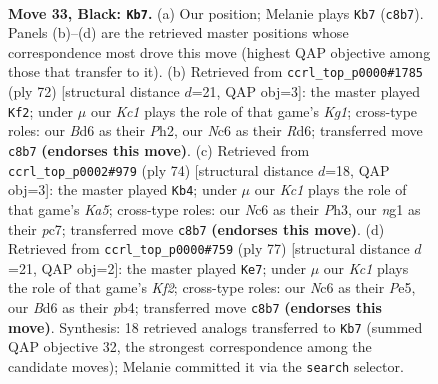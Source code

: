\documentclass[11pt]{article}
\begin{document}
\clearpage

\begin{figure}[p]\centering
\begin{subfigure}{0.46\textwidth}\centering
\resizebox{\linewidth}{!}{%
\newchessgame
\chessboard[
  setfen={2k5/8/2nb2p1/6P1/p7/3bB3/8/4K1N1 b - - 1 33},
  showmover=false,
  pgfstyle=straightmove, color=movearrow, markmove={c8-b7}
]}
\caption{}
\end{subfigure}\hfill
\begin{subfigure}{0.46\textwidth}\centering
\resizebox{\linewidth}{!}{%
\newchessgame
\chessboard[
  setfen={r7/7k/3R4/5p2/4b3/2B3P1/7P/6K1 w - - 1 37},
  showmover=false,
  pgfstyle=straightmove, color=movearrow, markmove={g1-f2}
]}
\caption{}
\end{subfigure}
\\[4pt]
\begin{subfigure}{0.46\textwidth}\centering
\resizebox{\linewidth}{!}{%
\newchessgame
\chessboard[
  setfen={8/2p5/6p1/K2k2P1/8/3b3P/5B2/8 w - - 1 38},
  showmover=false,
  pgfstyle=straightmove, color=movearrow, markmove={a5-b4}
]}
\caption{}
\end{subfigure}\hfill
\begin{subfigure}{0.46\textwidth}\centering
\resizebox{\linewidth}{!}{%
\newchessgame
\chessboard[
  setfen={8/5k2/5p2/4p3/1P4P1/8/K5P1/2bB4 b - - 0 39},
  showmover=false,
  pgfstyle=straightmove, color=movearrow, markmove={f7-e7}
]}
\caption{}
\end{subfigure}
\caption{\textbf{Move 33, Black: \texttt{Kb7}.} (a) Our position; Melanie plays \texttt{Kb7} (\texttt{c8b7}). Panels (b)--(d) are the retrieved master positions whose correspondence most drove this move (highest QAP objective among those that transfer to it). (b) Retrieved from \texttt{ccrl\_top\_p0000\#1785} (ply 72) [structural distance $d$=21, QAP obj=3]: the master played \texttt{Kf2}; under $\mu$ our \emph{Kc1} plays the role of that game's \emph{Kg1}; cross-type roles: our \emph{B}d6 as their \emph{P}h2, our \emph{N}c6 as their \emph{R}d6; transferred move \texttt{c8b7} \textbf{(endorses this move)}. (c) Retrieved from \texttt{ccrl\_top\_p0002\#979} (ply 74) [structural distance $d$=18, QAP obj=3]: the master played \texttt{Kb4}; under $\mu$ our \emph{Kc1} plays the role of that game's \emph{Ka5}; cross-type roles: our \emph{N}c6 as their \emph{P}h3, our \emph{n}g1 as their \emph{p}c7; transferred move \texttt{c8b7} \textbf{(endorses this move)}. (d) Retrieved from \texttt{ccrl\_top\_p0000\#759} (ply 77) [structural distance $d$=21, QAP obj=2]: the master played \texttt{Ke7}; under $\mu$ our \emph{Kc1} plays the role of that game's \emph{Kf2}; cross-type roles: our \emph{N}c6 as their \emph{P}e5, our \emph{B}d6 as their \emph{p}b4; transferred move \texttt{c8b7} \textbf{(endorses this move)}. Synthesis: 18 retrieved analogs transferred to \texttt{Kb7} (summed QAP objective 32, the strongest correspondence among the candidate moves); Melanie committed it via the \texttt{search} selector.}
\label{fig:thought-m65}
\end{figure}
\end{document}
